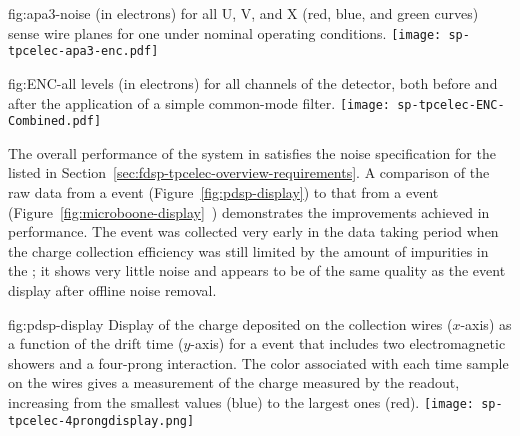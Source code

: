 \begin{dunefigure}
{fig:apa3-noise}
{ (in electrons) for all U, V, and X (red, blue, and green curves) sense 
wire planes for one   %
under nominal operating 
conditions.}
\texttt{[image: sp-tpcelec-apa3-enc.pdf]}
\end{dunefigure}

\begin{dunefigure}
{fig:ENC-all}
{ levels (in electrons) for all channels of the  detector, both
before and after the application of a simple common-mode filter.}
\texttt{[image: sp-tpcelec-ENC-Combined.pdf]}
\end{dunefigure}

The overall performance of the  system in 
 satisfies the 
 noise specification %
for the  %
listed in Section~\ref{sec:fdsp-tpcelec-overview-requirements}. 
A comparison of the raw data from 
a  event (Figure~\ref{fig:pdsp-display}) to 
that from a  event (Figure~\ref{fig:microboone-display}~\cite{Acciarri:2017sde}) 
demonstrates the improvements achieved in  performance. 
The  event was collected very early in the data taking
period when the charge collection efficiency was still limited
by the amount of impurities in the ; it shows very little
noise and appears to be of the same quality as the 
event display after offline noise removal. 


\begin{dunefigure}
{fig:pdsp-display}
{Display of the charge deposited on the collection wires ($x$-axis) as
a function of the drift time ($y$-axis) for a  event 
that includes two electromagnetic showers and a four-prong interaction.
The color associated with each time sample on the 
wires gives a measurement of the charge measured by the 
readout, increasing from the smallest values (blue) to the largest
ones (red).}
\texttt{[image: sp-tpcelec-4prongdisplay.png]}
\end{dunefigure}

